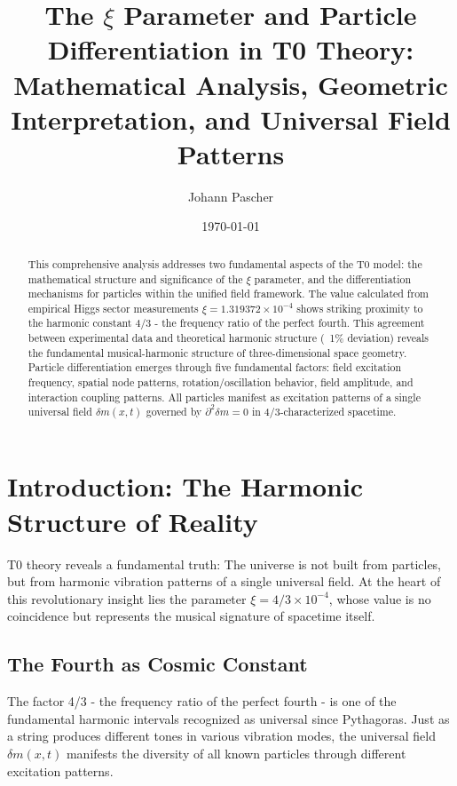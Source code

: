 \documentclass[12pt,a4paper]{article}
\title{The $\xi$ Parameter and Particle Differentiation in T0 Theory:\\
	\large Mathematical Analysis, Geometric Interpretation, and Universal Field Patterns}
\author{Johann Pascher}
\date{\today}
\newcommand{\mytimes}{\ensuremath{\times}}
\begin{document}
	
	\maketitle
	
	\begin{abstract}
		This comprehensive analysis addresses two fundamental aspects of the T0 model: the mathematical structure and significance of the $\xi$ parameter, and the differentiation mechanisms for particles within the unified field framework. The value calculated from empirical Higgs sector measurements $\xi = 1.319372 \mytimes 10^{-4}$ shows striking proximity to the harmonic constant 4/3 - the frequency ratio of the perfect fourth. This agreement between experimental data and theoretical harmonic structure (~1\% deviation) reveals the fundamental musical-harmonic structure of three-dimensional space geometry. Particle differentiation emerges through five fundamental factors: field excitation frequency, spatial node patterns, rotation/oscillation behavior, field amplitude, and interaction coupling patterns. All particles manifest as excitation patterns of a single universal field $\delta m(x,t)$ governed by $\partial^2\delta m = 0$ in 4/3-characterized spacetime.
		\end{abstract}
			
			\tableofcontents
			
			\section{Introduction: The Harmonic Structure of Reality}
			\label{sec:introduction}
			
			T0 theory reveals a fundamental truth: The universe is not built from particles, but from harmonic vibration patterns of a single universal field. At the heart of this revolutionary insight lies the parameter $\xi = 4/3 \times 10^{-4}$, whose value is no coincidence but represents the musical signature of spacetime itself.
			
			\subsection{The Fourth as Cosmic Constant}
			\label{subsec:fourth-constant}
			
			The factor 4/3 - the frequency ratio of the perfect fourth - is one of the fundamental harmonic intervals recognized as universal since Pythagoras. Just as a string produces different tones in various vibration modes, the universal field $\delta m(x,t)$ manifests the diversity of all known particles through different excitation patterns.
			
\end{document}
